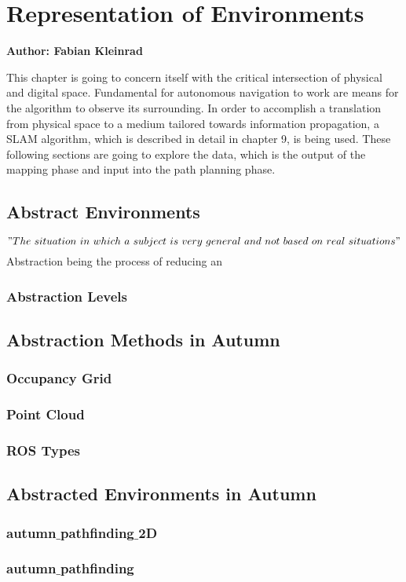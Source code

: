 \chapter{Representation of Environments}

\textbf{Author: Fabian Kleinrad} 

This chapter is going to concern itself with the critical intersection of physical and digital space. Fundamental for autonomous navigation to work are means for the algorithm to observe its surrounding. In order to accomplish a translation from physical space to a medium tailored towards information propagation, a SLAM algorithm, which is described in detail in chapter 9, is being used. These following sections are going to explore the data, which is the output of the mapping phase and input into the path planning phase.

\section{Abstract Environments}

\["The\ situation\ in\ which\ a\ subject\ is\ very\ general \ and\ not\ based\ on\ real\ situations"\]
Abstraction being the process of reducing an 


\subsection{Abstraction Levels}

\section{Abstraction Methods in Autumn}

\subsection{Occupancy Grid}

\subsection{Point Cloud}

\subsection{ROS Types}

\section{Abstracted Environments in Autumn}

\subsection{autumn$\_$pathfinding$\_$2D}

\subsection{autumn$\_$pathfinding}